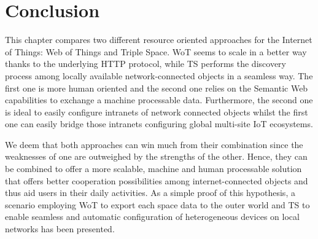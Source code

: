 \section{Conclusion}
\label{sec:tsc_wot_conclusion}



This chapter compares two different resource oriented approaches for the Internet of Things: Web of Things and Triple Space.
WoT seems to scale in a better way thanks to the underlying HTTP protocol, while TS performs the discovery process among locally available network-connected objects in a seamless way.
The first one is more human oriented and the second one relies on the Semantic Web capabilities to exchange a machine processable data.
Furthermore, the second one is ideal to easily configure intranets of network connected objects whilst the first one can easily bridge those intranets configuring global multi-site IoT ecosystems.

We deem that both approaches can win much from their combination since the weaknesses of one are outweighed by the strengths of the other.
Hence, they can be combined to offer a more scalable, machine and human processable solution that offers better cooperation possibilities among internet-connected objects and thus aid users in their daily activities.
As a simple proof of this hypothesis, a scenario employing WoT to export each space data to the outer world and TS to enable seamless and automatic configuration of heterogeneous devices on local networks has been presented.